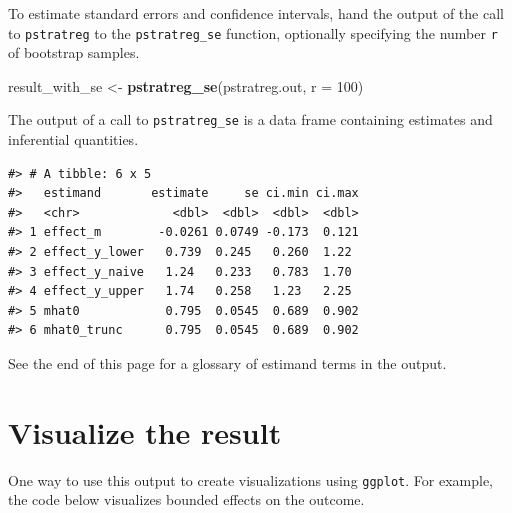 \documentclass[
]{book}
\newenvironment{Shaded}{\begin{snugshade}}{\end{snugshade}}
\newcommand{\AttributeTok}[1]{\textcolor[rgb]{0.13,0.29,0.53}{#1}}
\newcommand{\DecValTok}[1]{\textcolor[rgb]{0.00,0.00,0.81}{#1}}
\newcommand{\FunctionTok}[1]{\textcolor[rgb]{0.13,0.29,0.53}{\textbf{#1}}}
\newcommand{\NormalTok}[1]{#1}
\newcommand{\OtherTok}[1]{\textcolor[rgb]{0.56,0.35,0.01}{#1}}
\begin{document}
To estimate standard errors and confidence intervals, hand the output of the call to \texttt{pstratreg} to the \texttt{pstratreg\_se} function, optionally specifying the number \texttt{r} of bootstrap samples.

\begin{Shaded}
\begin{Highlighting}[]
\NormalTok{result\_with\_se }\OtherTok{\textless{}{-}} \FunctionTok{pstratreg\_se}\NormalTok{(pstratreg.out, }\AttributeTok{r =} \DecValTok{100}\NormalTok{)}
\end{Highlighting}
\end{Shaded}

The output of a call to \texttt{pstratreg\_se} is a data frame containing estimates and inferential quantities.

\begin{verbatim}
#> # A tibble: 6 x 5
#>   estimand       estimate     se ci.min ci.max
#>   <chr>             <dbl>  <dbl>  <dbl>  <dbl>
#> 1 effect_m        -0.0261 0.0749 -0.173  0.121
#> 2 effect_y_lower   0.739  0.245   0.260  1.22 
#> 3 effect_y_naive   1.24   0.233   0.783  1.70 
#> 4 effect_y_upper   1.74   0.258   1.23   2.25 
#> 5 mhat0            0.795  0.0545  0.689  0.902
#> 6 mhat0_trunc      0.795  0.0545  0.689  0.902
\end{verbatim}

See the end of this page for a glossary of estimand terms in the output.

\hypertarget{visualize-the-result}{%
\section{Visualize the result}\label{visualize-the-result}}

One way to use this output to create visualizations using \texttt{ggplot}. For example, the code below visualizes bounded effects on the outcome.
\end{document}
